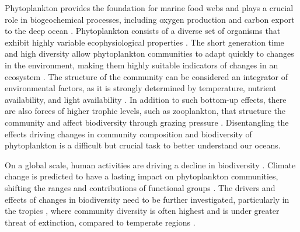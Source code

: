 \documentclass[draft]{agujournal2019}
\begin{document}

    Phytoplankton provides the foundation for marine food webs and plays a crucial role in biogeochemical processes, including oxygen production and carbon export to the deep ocean \cite{falkowski_biogeochemical_1998}.
    Phytoplankton consists of a diverse set of organisms that exhibit highly variable ecophysiological properties \cite{appeltans_magnitude_2012}. The short generation time and high diversity allow phytoplankton communities to adapt quickly to changes in the environment, making them highly suitable indicators of changes in an ecosystem \cite{alvarez-cobelas_what_1998, di_cavalho_temporal_2023}.
    The structure of the community can be considered an integrator of environmental factors, as it is strongly determined by temperature, nutrient availability, and light availability \cite{mouw_phytoplankton_2016}. In addition to such bottom-up effects, there are also forces of higher trophic levels, such as zooplankton, that structure the community and affect biodiversity through grazing pressure \cite{banas_adding_2011}. Disentangling the effects driving changes in community composition and biodiversity of phytoplankton is a difficult but crucial task to better understand our oceans.

    On a global scale, human activities are driving a decline in biodiversity \cite{tittensor_mid-term_2014}. Climate change is predicted to have a lasting impact on phytoplankton communities, shifting the ranges and contributions of functional groups \cite{henson_future_2021}. The drivers and effects of changes in biodiversity need to be further investigated, particularly in the tropics \cite{clarke_does_2017}, where community diversity is often highest \cite{brown_why_2014, righetti_global_2019} and is under greater threat of extinction, compared to temperate regions \cite{finnegan_paleontological_2015}.
\end{document}

